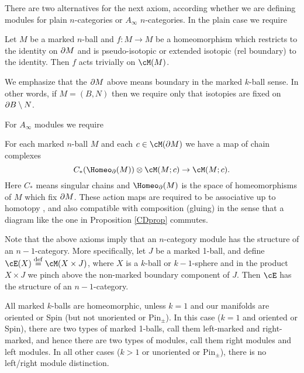 

There are two alternatives for the next axiom, according whether we are defining
modules for plain $n$-categories or $A_\infty$ $n$-categories.
In the plain case we require

{Let $M$ be a marked $n$-ball and $f: M\to M$ be a homeomorphism which restricts
to the identity on $\partial M$ and is pseudo-isotopic or extended isotopic (rel boundary) to the identity.
Then $f$ acts trivially on $\cM(M)$.}


We emphasize that the $\partial M$ above means boundary in the marked $k$-ball sense.
In other words, if $M = (B, N)$ then we require only that isotopies are fixed 
on $\partial B \setminus N$.

For $A_\infty$ modules we require

{For each marked $n$-ball $M$ and each $c\in \cM(\bd M)$ we have a map of chain complexes
\[
	C_*(\Homeo_\bd(M))\ot \cM(M; c) \to \cM(M; c) .
\]
Here $C_*$ means singular chains and $\Homeo_\bd(M)$ is the space of homeomorphisms of $M$
which fix $\partial M$.
These action maps are required to be associative up to homotopy
, and also compatible with composition (gluing) in the sense that
a diagram like the one in Proposition \ref{CDprop} commutes.
}

\medskip

Note that the above axioms imply that an $n$-category module has the structure
of an $n{-}1$-category.
More specifically, let $J$ be a marked 1-ball, and define $\cE(X)\deq \cM(X\times J)$,
where $X$ is a $k$-ball or $k{-}1$-sphere and in the product $X\times J$ we pinch 
above the non-marked boundary component of $J$.
Then $\cE$ has the structure of an $n{-}1$-category.

All marked $k$-balls are homeomorphic, unless $k = 1$ and our manifolds
are oriented or Spin (but not unoriented or $\text{Pin}_\pm$).
In this case ($k=1$ and oriented or Spin), there are two types
of marked 1-balls, call them left-marked and right-marked,
and hence there are two types of modules, call them right modules and left modules.
In all other cases ($k>1$ or unoriented or $\text{Pin}_\pm$),
there is no left/right module distinction.

